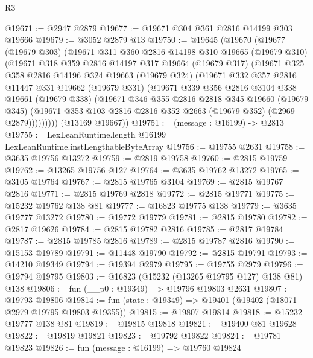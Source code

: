 \begin{lexlean}{R3}
\begin{coremodule}
@19671 := @2947 @2879
@19677 := @19671 @304 @361 @2816 @14199 @303 @19666
@19679 := @3052 @2879 @13
@19750 := @19645
    (@19670
      (@19677
        (@19679 @303)
        (@19671
          @311
          @360
          @2816
          @14198
          @310
          @19665
          (@19679 @310)
          (@19671
            @318
            @359
            @2816
            @14197
            @317
            @19664
            (@19679 @317)
            (@19671
              @325
              @358
              @2816
              @14196
              @324
              @19663
              (@19679 @324)
              (@19671
                @332
                @357
                @2816
                @11447
                @331
                @19662
                (@19679 @331)
                (@19671
                  @339
                  @356
                  @2816
                  @3104
                  @338
                  @19661
                  (@19679 @338)
                  (@19671
                    @346
                    @355
                    @2816
                    @2818
                    @345
                    @19660
                    (@19679 @345)
                    (@19671 @353 @103 @2816 @2816 @352 @2663 (@19679 @352) (@2969 @2879)))))))))
      (@13169 @19667))
@19751 := (message : @16199) -> @2813
@19755 := LexLeanRuntime.length @16199 LexLeanRuntime.instLengthableByteArray
@19756 := @19755 @2631
@19758 := @3635 @19756 @13272
@19759 := @2819 @19758
@19760 := @2815 @19759
@19762 := @13265 @19756 @127
@19764 := @3635 @19762 @13272
@19765 := @3105 @19764
@19767 := @2815 @19765 @3104
@19769 := @2815 @19767 @2816
@19771 := @2815 @19769 @2818
@19772 := @2815 @19771
@19775 := @15232 @19762 @138 @81
@19777 := @16823 @19775 @138
@19779 := @3635 @19777 @13272
@19780 := @19772 @19779
@19781 := @2815 @19780
@19782 := @2817 @19626
@19784 := @2815 @19782 @2816
@19785 := @2817 @19784
@19787 := @2815 @19785 @2816
@19789 := @2815 @19787 @2816
@19790 := @15153 @19789
@19791 := @11448 @19790
@19792 := @2815 @19791
@19793 := @14210 @19349
@19794 := @19394 @2979
@19795 := @19755 @2979
@19796 := @19794 @19795
@19803 := @16823 (@15232 (@13265 @19795 @127) @138 @81) @138
@19806 := fun (__p0 : @19349) => @19796 @19803 @2631
@19807 := @19793 @19806
@19814 := fun (state : @19349) => @19401 (@19402 (@18071 @2979 @19795 @19803 @19355))
@19815 := @19807 @19814
@19818 := @15232 @19777 @138 @81
@19819 := @19815 @19818
@19821 := @19400 @81 @19628
@19822 := @19819 @19821
@19823 := @19792 @19822
@19824 := @19781 @19823
@19826 := fun (message : @16199) => @19760 @19824

\end{coremodule}
\end{lexlean}

